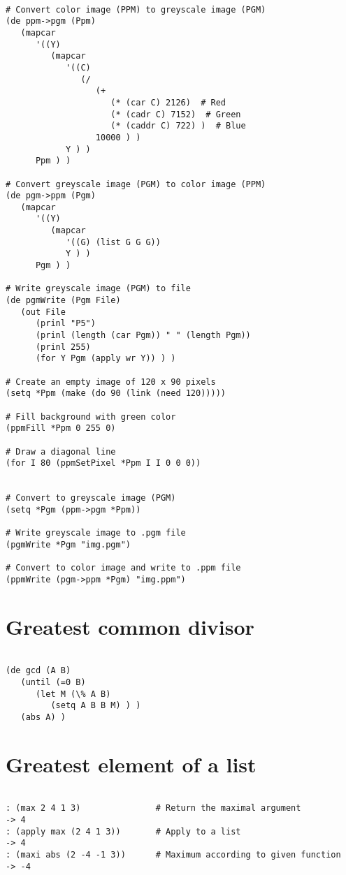 \begin{verbatim}

# Convert color image (PPM) to greyscale image (PGM)
(de ppm->pgm (Ppm)
   (mapcar
      '((Y)
         (mapcar
            '((C)
               (/
                  (+
                     (* (car C) 2126)  # Red
                     (* (cadr C) 7152)  # Green
                     (* (caddr C) 722) )  # Blue
                  10000 ) )
            Y ) )
      Ppm ) )

# Convert greyscale image (PGM) to color image (PPM)
(de pgm->ppm (Pgm)
   (mapcar
      '((Y)
         (mapcar
            '((G) (list G G G))
            Y ) )
      Pgm ) )

# Write greyscale image (PGM) to file
(de pgmWrite (Pgm File)
   (out File
      (prinl "P5")
      (prinl (length (car Pgm)) " " (length Pgm))
      (prinl 255)
      (for Y Pgm (apply wr Y)) ) )

# Create an empty image of 120 x 90 pixels
(setq *Ppm (make (do 90 (link (need 120)))))

# Fill background with green color
(ppmFill *Ppm 0 255 0)

# Draw a diagonal line
(for I 80 (ppmSetPixel *Ppm I I 0 0 0))


# Convert to greyscale image (PGM)
(setq *Pgm (ppm->pgm *Ppm))

# Write greyscale image to .pgm file
(pgmWrite *Pgm "img.pgm")

# Convert to color image and write to .ppm file
(ppmWrite (pgm->ppm *Pgm) "img.ppm")

\end{verbatim}

\section*{Greatest common divisor}

\begin{verbatim}

(de gcd (A B)
   (until (=0 B)
      (let M (\% A B)
         (setq A B B M) ) )
   (abs A) )

\end{verbatim}

\section*{Greatest element of a list}

\begin{verbatim}

: (max 2 4 1 3)               # Return the maximal argument
-> 4
: (apply max (2 4 1 3))       # Apply to a list
-> 4
: (maxi abs (2 -4 -1 3))      # Maximum according to given function
-> -4

\end{verbatim}

